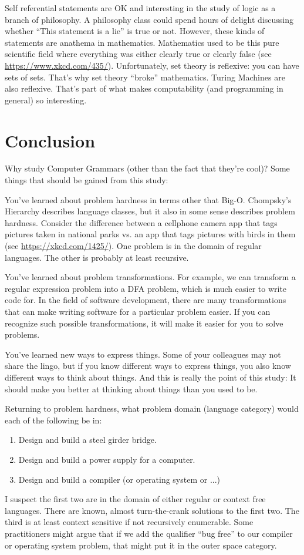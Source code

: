 \documentclass[letterpaper,12pt,openany,reqno]{book}%
\begin{document}
Self referential statements are OK and interesting in the study of logic as a branch of philosophy. A philosophy class could spend hours of delight discussing whether ``This statement is a lie'' is true or not. However, these kinds of statements are anathema in mathematics. Mathematics used to be this pure scientific field where everything was either clearly true or clearly false (see \url{https://www.xkcd.com/435/}). Unfortunately, set theory is reflexive: you can have sets of sets. That's why set theory ``broke'' mathematics. Turing Machines are also reflexive. That's part of what makes computability (and programming in general) so interesting. 

\chapter{Conclusion}
Why study Computer Grammars (other than the fact that they're cool)? Some things that should be gained from this study:

You've learned about problem hardness in terms other that Big-O. Chompsky's Hierarchy describes language classes, but it also in some sense describes problem hardness. Consider the difference between a cellphone camera app that tags pictures taken in national parks vs. an app that tags pictures with birds in them (see \url{https://xkcd.com/1425/}). One problem is in the domain of regular languages. The other is probably at least recursive.

You've learned about problem transformations. For example, we can transform a regular expression problem into a DFA problem, which is much easier to write code for. In the field of software development, there are many transformations that can make writing software for a particular problem easier. If you can recognize such possible transformations, it will make it easier for you to solve problems.

You've learned new ways to express things. Some of your colleagues may not share the lingo, but if you know different ways to express things, you also know different ways to think about things. And this is really the point of this study: It should make you better at thinking about things than you used to be.

Returning to problem hardness, what problem domain (language category) would each of the following be in:
\begin{enumerate}
\item Design and build a steel girder bridge.
\item Design and build a power supply for a computer.
\item Design and build a compiler (or operating system or ...)
\end{enumerate}
I suspect the first two are in the domain of either regular or context free languages. There are known, almost turn-the-crank solutions to the first two. The third is at least context sensitive if not recursively enumerable. Some practitioners might argue that if we add the qualifier ``bug free'' to our compiler or operating system problem, that might put it in the outer space category.
\end{document}
